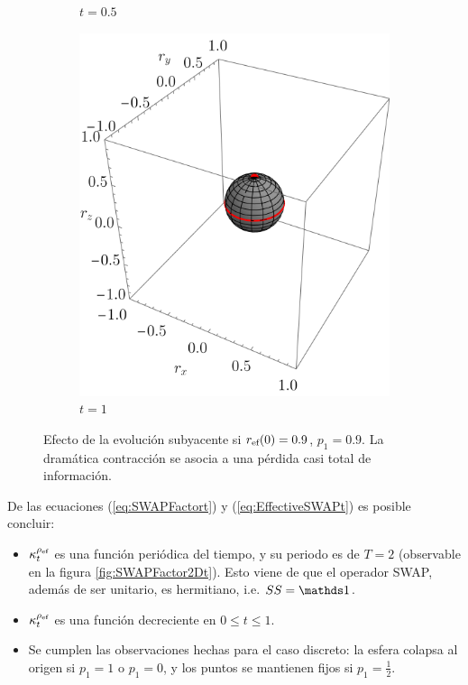 \begin{figure}[ht!]
\begin{subfigure}{0.32\textwidth}
    \caption{$t=0.5$}
  \end{subfigure}
  \begin{subfigure}{0.32\textwidth}
    \centering
    \includegraphics[width=0.9\linewidth]{chapter3/figures_toy/SWAP_t=1._p=0.9_r=0.9.png}
    \caption{$t=1$}
  \end{subfigure}
  \caption{Efecto de la evolución subyacente si $r_{\text{ef}}(0)=0.9$, $p_{1}=0.9$. La dramática contracción se asocia a una pérdida casi total de información. }
  \label{fig:SWAPFactorSequence}
  \end{figure}

De las ecuaciones (\ref{eq:SWAPFactort}) y (\ref{eq:EffectiveSWAPt}) es posible concluir:
\begin{itemize}
  \item $\kappa_{t}^{\rho_{\text{ef}}}$ es una función periódica del tiempo, y su periodo es de $T=2$ (observable en la figura \ref{fig:SWAPFactor2Dt}). Esto viene de que el operador SWAP, además de ser unitario, es hermitiano, i.e. $SS=\Id$.
  \item $\kappa_{t}^{\rho_{\text{ef}}}$ es una función decreciente en $0\leq t\leq 1$.
  \item Se cumplen las observaciones hechas para el caso discreto: la esfera colapsa al origen si $p_{1}=1$ o $p_{1}=0$, y los puntos se mantienen fijos si $p_{1}=\frac{1}{2}$.
\end{itemize}

